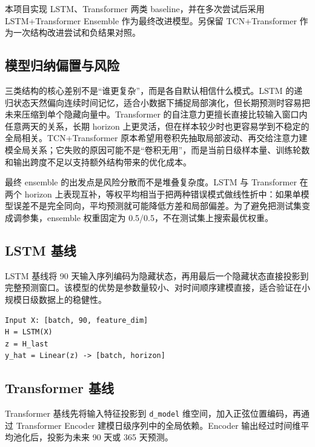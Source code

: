 \documentclass[11pt,a4paper]{article}
\begin{document}
本项目实现 LSTM、Transformer 两类 baseline，并在多次尝试后采用 LSTM+Transformer Ensemble 作为最终改进模型。另保留 TCN+Transformer 作为一次结构改进尝试和负结果对照。

\subsection{模型归纳偏置与风险}

三类结构的核心差别不是“谁更复杂”，而是各自默认相信什么模式。LSTM 的递归状态天然偏向连续时间记忆，适合小数据下捕捉局部演化，但长期预测时容易把未来压缩到单个隐藏向量中。Transformer 的自注意力更擅长直接比较输入窗口内任意两天的关系，长期 horizon 上更灵活，但在样本较少时也更容易学到不稳定的全局相关。TCN+Transformer 原本希望用卷积先抽取局部波动、再交给注意力建模全局关系；它失败的原因可能不是“卷积无用”，而是当前日级样本量、训练轮数和输出跨度不足以支持额外结构带来的优化成本。

最终 ensemble 的出发点是风险分散而不是堆叠复杂度。LSTM 与 Transformer 在两个 horizon 上表现互补，等权平均相当于把两种错误模式做线性折中：如果单模型误差不是完全同向，平均预测就可能降低方差和局部偏差。为了避免把测试集变成调参集，ensemble 权重固定为 0.5/0.5，不在测试集上搜索最优权重。

\subsection{LSTM 基线}

LSTM 基线将 90 天输入序列编码为隐藏状态，再用最后一个隐藏状态直接投影到完整预测窗口。该模型的优势是参数量较小、对时间顺序建模直接，适合验证在小规模日级数据上的稳健性。

\begin{center}
\begin{minipage}{0.82\textwidth}
\begin{verbatim}
Input X: [batch, 90, feature_dim]
H = LSTM(X)
z = H_last
y_hat = Linear(z) -> [batch, horizon]
\end{verbatim}
\end{minipage}
\end{center}

\subsection{Transformer 基线}

Transformer 基线先将输入特征投影到 \texttt{d\_model} 维空间，加入正弦位置编码，再通过 Transformer Encoder 建模日级序列中的全局依赖。Encoder 输出经过时间维平均池化后，投影为未来 90 天或 365 天预测。
\end{document}
